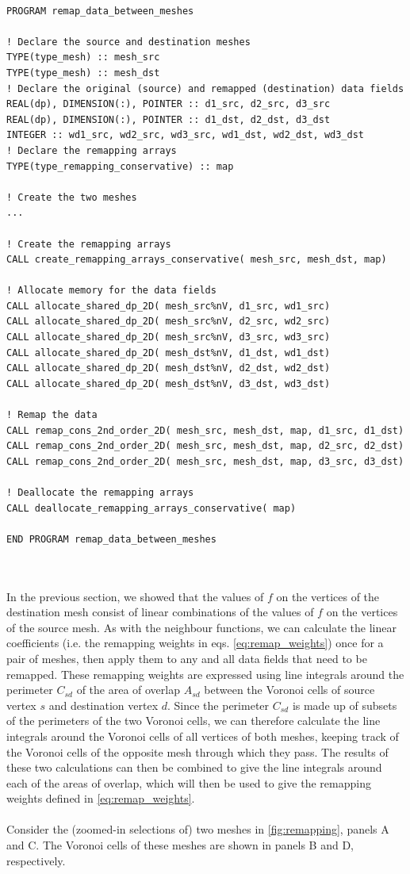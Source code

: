 \documentclass{article}
\begin{document}
\hrulefill
\begin{lstlisting}

PROGRAM remap_data_between_meshes

! Declare the source and destination meshes
TYPE(type_mesh) :: mesh_src
TYPE(type_mesh) :: mesh_dst
! Declare the original (source) and remapped (destination) data fields
REAL(dp), DIMENSION(:), POINTER :: d1_src, d2_src, d3_src
REAL(dp), DIMENSION(:), POINTER :: d1_dst, d2_dst, d3_dst
INTEGER :: wd1_src, wd2_src, wd3_src, wd1_dst, wd2_dst, wd3_dst
! Declare the remapping arrays
TYPE(type_remapping_conservative) :: map

! Create the two meshes
...

! Create the remapping arrays
CALL create_remapping_arrays_conservative( mesh_src, mesh_dst, map)

! Allocate memory for the data fields
CALL allocate_shared_dp_2D( mesh_src%nV, d1_src, wd1_src)
CALL allocate_shared_dp_2D( mesh_src%nV, d2_src, wd2_src)
CALL allocate_shared_dp_2D( mesh_src%nV, d3_src, wd3_src)
CALL allocate_shared_dp_2D( mesh_dst%nV, d1_dst, wd1_dst)
CALL allocate_shared_dp_2D( mesh_dst%nV, d2_dst, wd2_dst)
CALL allocate_shared_dp_2D( mesh_dst%nV, d3_dst, wd3_dst)

! Remap the data
CALL remap_cons_2nd_order_2D( mesh_src, mesh_dst, map, d1_src, d1_dst)
CALL remap_cons_2nd_order_2D( mesh_src, mesh_dst, map, d2_src, d2_dst)
CALL remap_cons_2nd_order_2D( mesh_src, mesh_dst, map, d3_src, d3_dst)

! Deallocate the remapping arrays
CALL deallocate_remapping_arrays_conservative( map)

END PROGRAM remap_data_between_meshes

\end{lstlisting}
\hrulefill
\\
\\
In the previous section, we showed that the values of $f$ on the vertices of the destination mesh consist of linear combinations of the values of $f$ on the vertices of the source mesh. As with the neighbour functions, we can calculate the linear coefficients (i.e. the remapping weights in eqs. \eqref{eq:remap_weights}) once for a pair of meshes, then apply them to any and all data fields that need to be remapped. These remapping weights are expressed using line integrals around the perimeter $C_{sd}$ of the area of overlap $A_{sd}$ between the Voronoi cells of source vertex $s$ and destination vertex $d$. Since the perimeter $C_{sd}$ is made up of subsets of the perimeters of the two Voronoi cells, we can therefore calculate the line integrals around the Voronoi cells of all vertices of both meshes, keeping track of the Voronoi cells of the opposite mesh through which they pass. The results of these two calculations can then be combined to give the line integrals around each of the areas of overlap, which will then be used to give the remapping weights defined in \eqref{eq:remap_weights}.\\
\\
Consider the (zoomed-in selections of) two meshes in \ref{fig:remapping}, panels A and C. The Voronoi cells of these meshes are shown in panels B and D, respectively.
\end{document}
